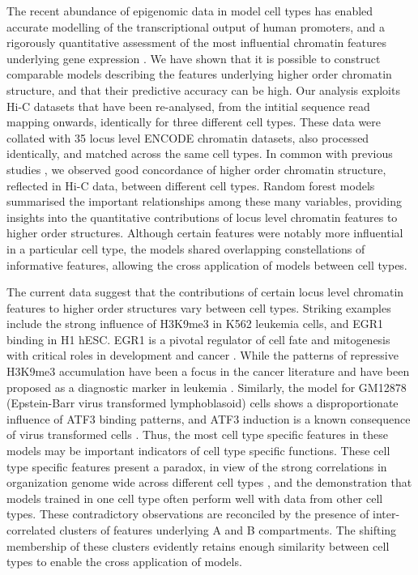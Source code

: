 \documentclass[a4paper,10pt,oneside]{book}
\begin{document}
The recent abundance of epigenomic data in model cell types has
enabled accurate modelling of the transcriptional output of human
promoters, and a rigorously quantitative assessment of the most
influential chromatin features underlying gene expression
\cite{Dong2012}. We have shown that it is possible to construct
comparable models describing the features underlying higher order
chromatin structure, and that their predictive accuracy can be
high. Our analysis exploits Hi-C datasets that have been re-analysed,
from the intitial sequence read mapping onwards, identically for three
different cell types. These data were collated with 35 locus level
ENCODE chromatin datasets, also processed identically, and matched
across the same cell types. In common with previous studies
\cite{Chambers2013, Dixon2012}, we observed good concordance of higher
order chromatin structure, reflected in Hi-C data, between different
cell types. Random forest models summarised the important
relationships among these many variables, providing insights into the
quantitative contributions of locus level chromatin features to higher
order structures. Although certain features were notably more
influential in a particular cell type, the models shared overlapping
constellations of informative features, allowing the cross application
of models between cell types.



The current data suggest that the contributions of certain locus level
chromatin features to higher order structures vary between cell
types. Striking examples include the strong influence of H3K9me3 in
K562 leukemia cells, and EGR1 binding in H1 hESC. EGR1 is a pivotal
regulator of cell fate and mitogenesis with critical roles in
development and cancer \cite{Zwang2012}. While the patterns of
repressive H3K9me3 accumulation have been a focus in the cancer
literature and have been proposed as a diagnostic marker in leukemia
\cite{Muller-Tidow2010}. Similarly, the model for GM12878
(Epstein-Barr virus transformed lymphoblasoid) cells shows a
disproportionate influence of ATF3 binding patterns, and ATF3
induction is a known consequence of virus transformed cells
\cite{Hagmeyer1996}. Thus, the most cell type specific features in
these models may be important indicators of cell type specific
functions. These cell type specific features present a paradox, in
view of the strong correlations in organization genome wide across
different cell types \cite{Chambers2013, Dixon2012}, and the
demonstration that models trained in one cell type often perform well
with data from other cell types. These contradictory observations are
reconciled by the presence of inter-correlated clusters of features
underlying A and B compartments. The shifting membership of these
clusters evidently retains enough similarity between cell types to
enable the cross application of models.
\end{document}
